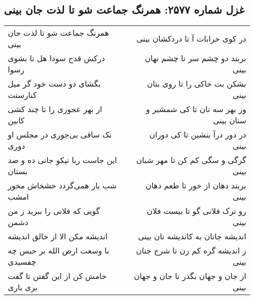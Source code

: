 \begin{center}
\section*{غزل شماره ۲۵۷۷: همرنگ جماعت شو تا لذت جان بینی}
\label{sec:2577}
\begin{longtable}{l p{0.5cm} r}
همرنگ جماعت شو تا لذت جان بینی
&&
در کوی خرابات آ تا دردکشان بینی
\\
درکش قدح سودا هل تا بشوی رسوا
&&
بربند دو چشم سر تا چشم نهان بینی
\\
بگشای دو دست خود گر میل کنارستت
&&
بشکن بت خاکی را تا روی بتان بینی
\\
از بهر عجوزی را تا چند کشی کابین
&&
وز بهر سه نان تا کی شمشیر و سنان بینی
\\
نک ساقی بی‌جوری در مجلس او دوری
&&
در دور درآ بنشین تا کی دوران بینی
\\
این جاست ربا نیکو جانی ده و صد بستان
&&
گرگی و سگی کم کن تا مهر شبان بینی
\\
شب یار همی‌گردد خشخاش مخور امشب
&&
بربند دهان از خور تا طعم دهان بینی
\\
گویی که فلانی را ببرید ز من دشمن
&&
رو ترک فلانی گو تا بیست فلان بینی
\\
اندیشه مکن الا از خالق اندیشه
&&
اندیشه جانان به کاندیشه نان بینی
\\
با وسعت ارض الله بر حبس چه چفسیدی
&&
ز اندیشه گره کم زن تا شرح جنان بینی
\\
خامش کن از این گفتن تا گفت بری باری
&&
از جان و جهان بگذر تا جان و جهان بینی
\\
\end{longtable}
\end{center}
